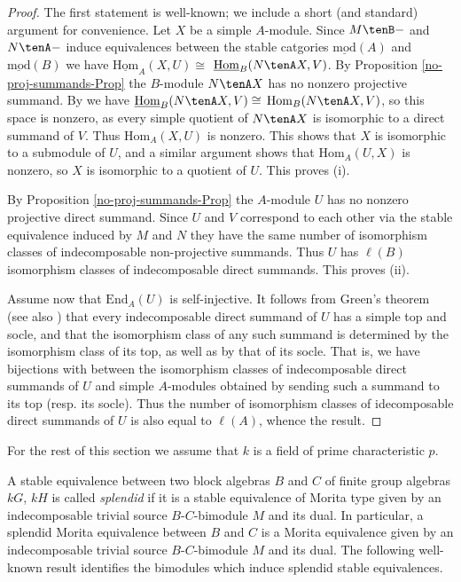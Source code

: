 \documentclass{amsart}
\theoremstyle{plain}\newtheorem{Theorem}{Theorem}[section]
\theoremstyle{plain}\newtheorem{Conjecture}[Theorem]{Conjecture}
\theoremstyle{plain}\newtheorem{Corollary}[Theorem]{Corollary}
\theoremstyle{plain}\newtheorem{Lemma}[Theorem]{Lemma}
\theoremstyle{plain}\newtheorem{Proposition}[Theorem]{Proposition}
\theoremstyle{definition}\newtheorem{Definition}[Theorem]{Definition}
\theoremstyle{definition}\newtheorem{Example}[Theorem]{Example}
\theoremstyle{definition}\newtheorem{Examples}[Theorem]{Examples}
\theoremstyle{definition}\newtheorem{Exercise}[Theorem]{Exercise}
\theoremstyle{definition}\newtheorem{Notation}[Theorem]{Notation}
\theoremstyle{definition}\newtheorem{Remark}[Theorem]{Remark}
\theoremstyle{definition}\newtheorem{Remarks}[Theorem]{Remarks}
\theoremstyle{plain}\newtheorem{Statement}[Theorem]{}
\def\End{\mathrm{End}}
\def\Hom{\mathrm{Hom}}           \def\tenkS{\otimes_{kS}}
\def\Hombar{\underline{\mathrm{Hom}}}
\def\modbar{\underline{\mathrm{mod}}}
\begin{document}
\begin{proof}
The first statement is well-known; we include a short (and standard) argument 
for convenience. Let $X$ be a simple $A$-module. 
Since $M\tenB-$ and $N\tenA-$ induce
equivalences between the stable catgories $\modbar(A)$ and $\modbar(B)$
we have $\Hombar_A(X,U)\cong$ $\Hombar_B(N\tenA X , V)$.
By  Proposition \ref{no-proj-summands-Prop} the $B$-module $N\tenA X$
has no nonzero projective summand. By \cite[Corollary 4.13.4]{LiBookI}
we have $\Hombar_B(N\tenA X,V)\cong$ $\Hom_B(N\tenA X,V)$, so this
space is nonzero, as every simple quotient of $N\tenA X$ is isomorphic to a 
direct summand of $V$. Thus $\Hom_A(X,U)$ is nonzero.
This shows that $X$ is isomorphic to a submodule of $U$, and a similar
argument shows that $\Hom_A(U,X)$ is nonzero, so $X$ is isomorphic to
a quotient of $U$. This proves (i).

By Proposition \ref{no-proj-summands-Prop} the $A$-module $U$ has
no nonzero projective direct summand. Since $U$ and $V$ correspond to each
other via the stable equivalence induced by $M$ and $N$ they have
the same number of isomorphism classes of indecomposable non-projective
summands. Thus $U$ has $\ell(B)$ isomorphism classes of indecomposable 
direct summands. This proves (ii).

Assume now that $\End_A(U)$ is self-injective. It follows from 
Green's theorem  \cite[Theorem 1]{Green78} (see also \cite[Theorem 2.13]{Geck01}) 
that every indecomposable direct summand of $U$ has a 
simple top and socle, and that the isomorphism class of any such summand is 
determined by the isomorphism class of its top, as well as by that of its socle. 
That is, we have bijections with between the isomorphism classes of 
indecomposable direct summands of $U$ and simple $A$-modules 
obtained by sending such a summand to its top (resp. its socle). 
Thus the number of isomorphism classes of idecomposable direct summands
of $U$ is also equal to $\ell(A)$, whence the result.
\end{proof}

For the rest of this section we assume that  $k$  is a field of  prime characteristic $p$.

\medskip
 A  stable  equivalence  between two block algebras   $B$ and $C$ of finite
group  algebras $kG$, $kH$  is called {\em splendid}  if it is a stable equivalence of 
Morita type given  by an indecomposable  trivial source $B$-$C$-bimodule 
$M$ and its dual.  In particular, a  splendid   Morita equivalence between  $B$ and  
$C$  is a  Morita  equivalence given   by an indecomposable  trivial source 
$B$-$C$-bimodule  $M$ and its dual.  The following well-known  result   identifies 
the  bimodules  which induce splendid   stable equivalences.
\end{document}
